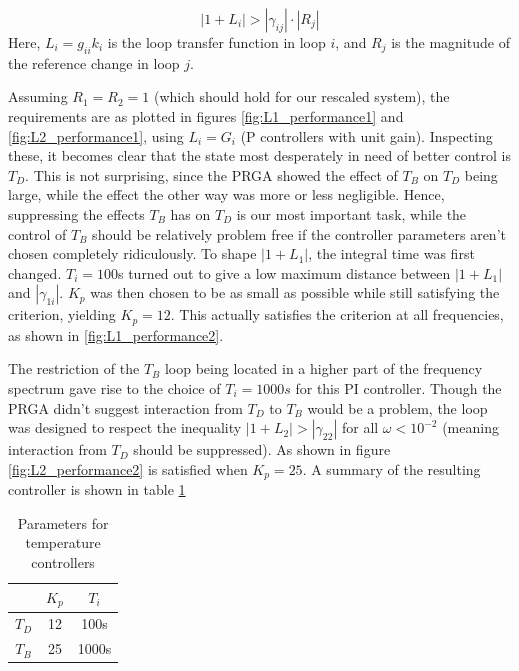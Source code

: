 \documentclass[12pt]{article}
\begin{document}
\begin{equation}
| 1 + L_i | > | \gamma_{ij} | \cdot |R_j|
\end{equation}
Here, $L_i = g_{ii}k_i$ is the loop transfer function in loop $i$, and $R_j$ is the magnitude of the reference change in loop $j$.

Assuming $R_1 = R_2 = 1$ (which should hold for our rescaled system), the requirements are as plotted in figures \ref{fig:L1_performance1} and \ref{fig:L2_performance1}, using $L_i = G_i$ (P controllers with unit gain). Inspecting these, it becomes clear that the state most desperately in need of better control is $T_D$. This is not surprising, since the PRGA showed the effect of $T_B$ on $T_D$ being large, while the effect the other way was more or less negligible. Hence, suppressing the effects $T_B$ has on $T_D$ is our most important task, while the control of $T_B$ should be relatively problem free if the controller parameters aren't chosen completely ridiculously. To shape $| 1 + L_1 |$, the integral time was first changed. $T_i = 100$s turned out to give a low maximum distance between $| 1 + L_1 |$ and $| \gamma_{1i} |$. $K_p$ was then chosen to be as small as possible while still satisfying the criterion, yielding $K_p = 12$. This actually satisfies the criterion at all frequencies, as shown in \ref{fig:L1_performance2}.

The restriction of the $T_B$ loop being located in a higher part of the frequency spectrum gave rise to the choice of $T_i = 1000s$ for this PI controller. Though the PRGA didn't suggest interaction from $T_D$ to $T_B$ would be a problem, the loop was designed to respect the inequality $| 1 + L_2 | > | \gamma_{22} |$ for all $\omega < 10^{-2}$ (meaning interaction from $T_D$ should be suppressed). As shown in figure \ref{fig:L2_performance2} is satisfied when $K_p = 25$. A summary of the resulting controller is shown in table \ref{tab:LV_parameters}

\begin{table}[h]
\centering
\begin{tabular}{c | c | c }
 & $K_p$ & $T_i$  \\ \hline
 $T_D$ & 12 & 100s \\
 $T_B$ & 25 & 1000s
\end{tabular}
\caption{Parameters for temperature controllers}
\label{tab:LV_parameters}
\end{table}
\end{document}
